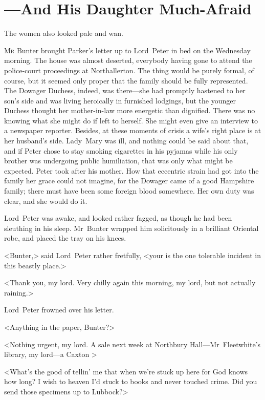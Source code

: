 
\chapter{—And His Daughter Much-Afraid}

\epigraph{The women also looked pale and wan.}{}


\lettrine{M}{r} Bunter brought Parker's letter up to Lord~Peter in bed on the Wednesday morning. The house was almost deserted, everybody having gone to attend the police-court proceedings at Northallerton. The thing would be purely formal, of course, but it seemed only proper that the family should be fully represented. The Dowager Duchess, indeed, was there—she had promptly hastened to her son's side and was living heroically in furnished lodgings, but the younger Duchess thought her mother-in-law more energetic than dignified. There was no knowing what she might do if left to herself. She might even give an interview to a newspaper reporter. Besides, at these moments of crisis a wife's right place is at her husband's side. Lady~Mary was ill, and nothing could be said about that, and if Peter chose to stay smoking cigarettes in his pyjamas while his only brother was undergoing public humiliation, that was only what might be expected. Peter took after his mother. How that eccentric strain had got into the family her grace could not imagine, for the Dowager came of a good Hampshire family; there must have been some foreign blood somewhere. Her own duty was clear, and she would do it.

Lord~Peter was awake, and looked rather fagged, as though he had been sleuthing in his sleep. Mr~Bunter wrapped him solicitously in a brilliant Oriental robe, and placed the tray on his knees.

<Bunter,> said Lord~Peter rather fretfully, <your  is the one tolerable incident in this beastly place.>

<Thank you, my lord. Very chilly again this morning, my lord, but not actually raining.>

Lord~Peter frowned over his letter.

<Anything in the paper, Bunter?>

<Nothing urgent, my lord. A sale next week at Northbury Hall—Mr~Fleetwhite's library, my lord—a Caxton \longdash>

<What's the good of tellin' me that when we're stuck up here for God knows how long? I wish to heaven I'd stuck to books and never touched crime. Did you send those specimens up to Lubbock?>

